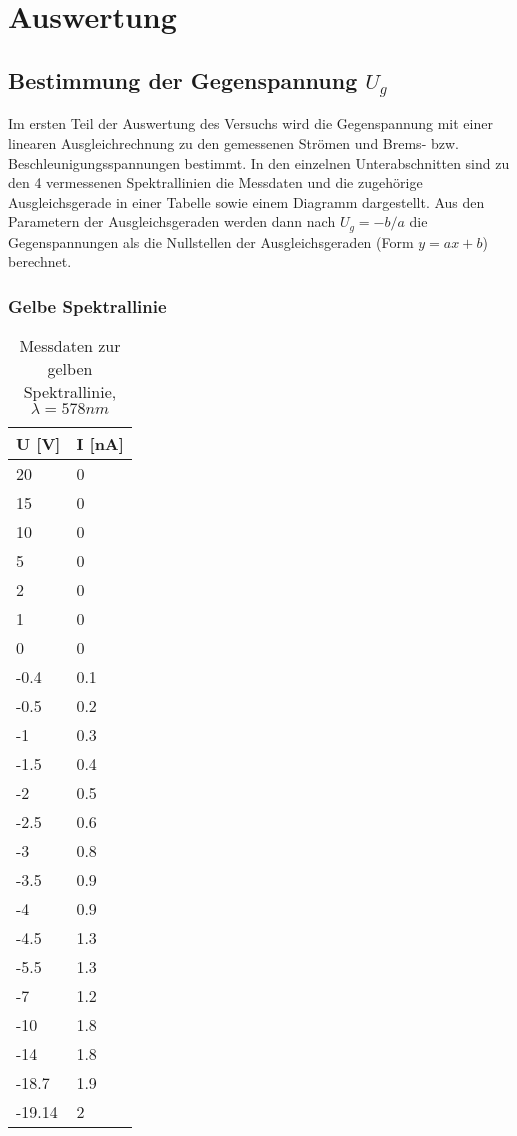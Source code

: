 \section{Auswertung}
\label{sec:Auswertung}
\subsection{Bestimmung der Gegenspannung $U_g$}
Im ersten Teil der Auswertung des Versuchs wird die Gegenspannung mit einer linearen Ausgleichrechnung zu den gemessenen Strömen und Brems- bzw. Beschleunigungsspannungen bestimmt. In den einzelnen Unterabschnitten sind zu den 4 vermessenen Spektrallinien die Messdaten und die zugehörige Ausgleichsgerade in einer Tabelle sowie einem Diagramm dargestellt. Aus den Parametern der Ausgleichsgeraden werden dann nach $U_g=-b/a$ die Gegenspannungen als die Nullstellen der Ausgleichsgeraden (Form $y=ax+b$) berechnet.
\subsubsection{Gelbe Spektrallinie}
\begin{table}[H]
  \centering
  \caption{Messdaten zur gelben Spektrallinie, $\lambda=578nm$}
  \label{tab:gelb}
  \begin{tabular}{ll}
  \toprule
  U {[}V{]} & I {[}nA{]} \\
  \midrule
  20 & 0 \\
  15 & 0 \\
  10 & 0 \\
  5 & 0 \\
  2 & 0 \\
  1 & 0 \\
  0 & 0 \\
  -0.4 & 0.1 \\
  -0.5 & 0.2 \\
  -1 & 0.3 \\
  -1.5 & 0.4 \\
  -2 & 0.5 \\
  -2.5 & 0.6 \\
  -3 & 0.8 \\
  -3.5 & 0.9 \\
  -4 & 0.9 \\
  -4.5 & 1.3 \\
  -5.5 & 1.3 \\
  -7 & 1.2 \\
  -10 & 1.8 \\
  -14 & 1.8 \\
  -18.7 & 1.9 \\
  -19.14 & 2\\\bottomrule
  \end{tabular}
  \end{table}

